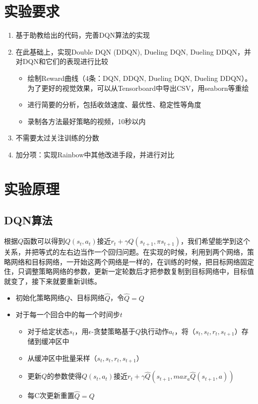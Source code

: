 \documentclass[a4paper]{ctexart}
\begin{document}

\tableofcontents
\newpage

\section{实验要求}
\begin{enumerate}
    \item 基于助教给出的代码，完善DQN算法的实现
    \item 在此基础上，实现Double DQN (DDQN), Dueling DQN, Dueling DDQN，并对DQN和它们的表现进行比较
    \begin{itemize}
        \item 绘制Reward曲线（4条：DQN, DDQN, Dueling DQN, Dueling DDQN）。为了更好的视觉效果，可以从Tensorboard中导出CSV，用seaborn等重绘
        \item 进行简要的分析，包括收敛速度、最优性、稳定性等角度
        \item 录制各方法最好策略的视频，10秒以内
    \end{itemize}
    \item 不需要太过关注训练的分数
    \item 加分项：实现Rainbow中其他改进手段，并进行对比
\end{enumerate}

\section{实验原理}

\subsection{DQN算法}
根据$Q$函数可以得到$Q(s_t,a_t)$接近$r_t+\gamma Q(s_{t+1},\pi{s_{t+1}})$，我们希望能学到这个关系，并把等式的左右边当作一个回归问题。在实现的时候，利用到两个网络，策略网络和目标网络，一开始这两个网络是一样的，在训练的时候，把目标网络固定住，只调整策略网络的参数，更新一定轮数后才把参数复制到目标网络中，目标值就变了，接下来就要重新训练。
\begin{itemize}
    \item 初始化策略网络$Q$、目标网络$\hat{Q}$，令$\hat{Q} = Q$
    \item 对于每一个回合中的每一个时间步$t$
    \begin{itemize}
        \item 对于给定状态$s_t$，用$\epsilon$-贪婪策略基于$Q$执行动作$a_t$，将（$s_t,s_t,r_t,s_{t+1}$）存储到缓冲区中
        \item 从缓冲区中批量采样（$s_t,s_t,r_t,s_{t+1}$）
        \item 更新$Q$的参数使得$Q(s_t,a_t)$接近$r_t+\gamma \hat{Q}(s_{t+1},max_a\hat{Q}(s_{t+1},a))$
        \item 每C次更新重置$\hat{Q} = Q$
    \end{itemize}
\end{itemize}
\end{document}
